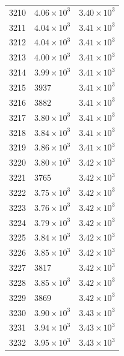 \begin{table}[H]
\begin{tabular}{lll}
3210 & $\displaystyle 4.06 \times 10^{3}$ & $\displaystyle 3.40 \times 10^{3}$ \\
3211 & $\displaystyle 4.04 \times 10^{3}$ & $\displaystyle 3.41 \times 10^{3}$ \\
3212 & $\displaystyle 4.04 \times 10^{3}$ & $\displaystyle 3.41 \times 10^{3}$ \\
3213 & $\displaystyle 4.00 \times 10^{3}$ & $\displaystyle 3.41 \times 10^{3}$ \\
3214 & $\displaystyle 3.99 \times 10^{3}$ & $\displaystyle 3.41 \times 10^{3}$ \\
3215 & 3937 & $\displaystyle 3.41 \times 10^{3}$ \\
3216 & 3882 & $\displaystyle 3.41 \times 10^{3}$ \\
3217 & $\displaystyle 3.80 \times 10^{3}$ & $\displaystyle 3.41 \times 10^{3}$ \\
3218 & $\displaystyle 3.84 \times 10^{3}$ & $\displaystyle 3.41 \times 10^{3}$ \\
3219 & $\displaystyle 3.86 \times 10^{3}$ & $\displaystyle 3.41 \times 10^{3}$ \\
3220 & $\displaystyle 3.80 \times 10^{3}$ & $\displaystyle 3.42 \times 10^{3}$ \\
3221 & 3765 & $\displaystyle 3.42 \times 10^{3}$ \\
3222 & $\displaystyle 3.75 \times 10^{3}$ & $\displaystyle 3.42 \times 10^{3}$ \\
3223 & $\displaystyle 3.76 \times 10^{3}$ & $\displaystyle 3.42 \times 10^{3}$ \\
3224 & $\displaystyle 3.79 \times 10^{3}$ & $\displaystyle 3.42 \times 10^{3}$ \\
3225 & $\displaystyle 3.84 \times 10^{3}$ & $\displaystyle 3.42 \times 10^{3}$ \\
3226 & $\displaystyle 3.85 \times 10^{3}$ & $\displaystyle 3.42 \times 10^{3}$ \\
3227 & 3817 & $\displaystyle 3.42 \times 10^{3}$ \\
3228 & $\displaystyle 3.85 \times 10^{3}$ & $\displaystyle 3.42 \times 10^{3}$ \\
3229 & 3869 & $\displaystyle 3.42 \times 10^{3}$ \\
3230 & $\displaystyle 3.90 \times 10^{3}$ & $\displaystyle 3.43 \times 10^{3}$ \\
3231 & $\displaystyle 3.94 \times 10^{3}$ & $\displaystyle 3.43 \times 10^{3}$ \\
3232 & $\displaystyle 3.95 \times 10^{3}$ & $\displaystyle 3.43 \times 10^{3}$ \\

\end{tabular}
\end{table}
